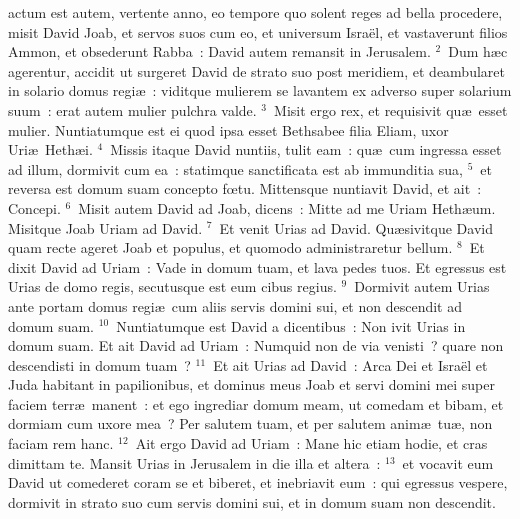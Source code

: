 \bchapter
{}actum est autem, vertente anno, eo tempore quo solent reges ad bella procedere, misit David Joab, et servos suos cum eo, et universum Isra\"el, et vastaverunt filios Ammon, et obsederunt Rabba~: David autem remansit in Jerusalem.
${}^{2}$~Dum h\ae c agerentur, accidit ut surgeret David de strato suo post meridiem, et deambularet in solario domus regi\ae~: viditque mulierem se lavantem ex adverso super solarium suum~: erat autem mulier pulchra valde.
${}^{3}$~Misit ergo rex, et requisivit qu\ae\ esset mulier. Nuntiatumque est ei quod ipsa esset Bethsabee filia Eliam, uxor Uri\ae\ Heth\ae i.
${}^{4}$~Missis itaque David nuntiis, tulit eam~: qu\ae\ cum ingressa esset ad illum, dormivit cum ea~: statimque sanctificata est ab immunditia sua,
${}^{5}$~et reversa est domum suam concepto fœtu. Mittensque nuntiavit David, et ait~: Concepi.
${}^{6}$~Misit autem David ad Joab, dicens~: Mitte ad me Uriam Heth\ae um. Misitque Joab Uriam ad David.
${}^{7}$~Et venit Urias ad David. Qu\ae sivitque David quam recte ageret Joab et populus, et quomodo administraretur bellum.
${}^{8}$~Et dixit David ad Uriam~: Vade in domum tuam, et lava pedes tuos. Et egressus est Urias de domo regis, secutusque est eum cibus regius.
${}^{9}$~Dormivit autem Urias ante portam domus regi\ae\ cum aliis servis domini sui, et non descendit ad domum suam.
${}^{10}$~Nuntiatumque est David a dicentibus~: Non ivit Urias in domum suam. Et ait David ad Uriam~: Numquid non de via venisti~? quare non descendisti in domum tuam~?
${}^{11}$~Et ait Urias ad David~: Arca Dei et Isra\"el et Juda habitant in papilionibus, et dominus meus Joab et servi domini mei super faciem terr\ae\ manent~: et ego ingrediar domum meam, ut comedam et bibam, et dormiam cum uxore mea~? Per salutem tuam, et per salutem anim\ae\ tu\ae , non faciam rem hanc.
${}^{12}$~Ait ergo David ad Uriam~: Mane hic etiam hodie, et cras dimittam te. Mansit Urias in Jerusalem in die illa et altera~:
${}^{13}$~et vocavit eum David ut comederet coram se et biberet, et inebriavit eum~: qui egressus vespere, dormivit in strato suo cum servis domini sui, et in domum suam non descendit.


